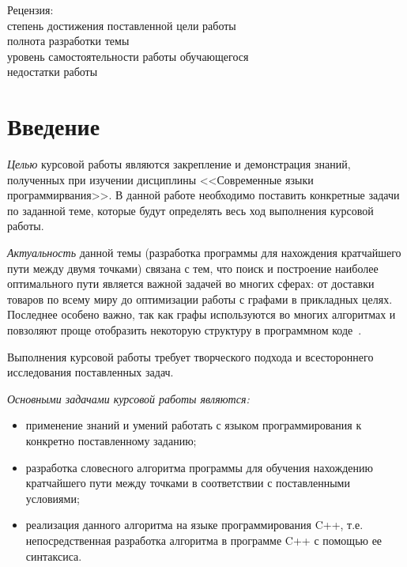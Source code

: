 \documentclass[chapterprefix=true,headings=onelineappendix]{scrartcl}
\begin{document}
\begin{titlepage}
	\vfill

	\begin{flushleft}
		Рецензия:  \\
		степень достижения поставленной цели работы \hrulefill{} \\
		полнота разработки темы \hrulefill{ } \\
		уровень самостоятельности работы обучающегося \hrulefill{} \\
		недостатки работы \hrulefill{}\\
	\end{flushleft}

\end{titlepage}

\tableofcontents
\listoflistings

\newpage{}
\section*{Введение}

\textit{Целью} курсовой работы являются закрепление и демонстрация знаний,
полученных при изучении дисциплины <<Современные языки программирвания>>. В
данной работе необходимо поставить конкретные задачи по заданной теме, которые
будут определять весь ход выполнения курсовой работы.

\textit{Актуальность} данной темы (разработка программы для нахождения
кратчайшего пути между двумя точками) связана с тем, что поиск и
построение наиболее оптимального пути является важной задачей во
многих сферах: от доставки товаров по всему миру до оптимизации работы
с графами в прикладных
целях\cite{Sokolov-graph_in_logistic,Vardomatskaya-optimization_with_graphs}. Последнее
особено важно, так как графы используются во многих алгоритмах и
повзоляют проще отобразить некоторую структуру в программном
коде~\cite{Брюске1998-графыАлгоритмов}.

Выполнения курсовой работы требует творческого подхода и всестороннего
исследования поставленных задач.

\emph{Основными задачами курсовой работы являются:}
\begin{itemize}
	\item применение знаний и умений работать с языком программирования к
	     конкретно поставленному заданию;
	\item разработка словесного алгоритма программы для обучения
	     нахождению кратчайшего пути между точками в соответствии с
	     поставленными условиями;
	\item реализация данного алгоритма на языке программирования C++,
	     т.е. непосредственная разработка алгоритма в программе C++ с помощью
	     ее синтаксиса.
\end{itemize}
\end{document}
